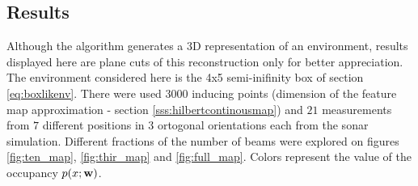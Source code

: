 \subsection{Results}

Although the algorithm generates a 3D representation of an environment, results
displayed here are plane cuts of this reconstruction only for better
appreciation. The environment considered here is the 4x5 semi-inifinity box of
section \ref{eq:boxlikenv}. There were used $3000$ inducing points (dimension of
the feature map approximation - section \ref{sss:hilbertcontinousmap}) and $21$
measurements from $7$ different positions in $3$ ortogonal orientations each
from the sonar simulation. Different fractions of the number of beams were
explored on figures \ref{fig:ten_map}, \ref{fig:thir_map} and
\ref{fig:full_map}. Colors represent the value of the occupancy
$p(x;\mathrm{\mathbf{w}})$.

